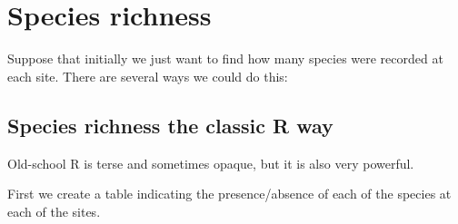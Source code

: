 \documentclass[
  letterpaper,
  DIV=11,
  numbers=noendperiod]{scrreprt}
\newenvironment{Shaded}{\begin{snugshade}}{\end{snugshade}}
\newcommand{\CommentTok}[1]{\textcolor[rgb]{0.37,0.37,0.37}{#1}}
\newcommand{\FunctionTok}[1]{\textcolor[rgb]{0.28,0.35,0.67}{#1}}
\newcommand{\NormalTok}[1]{\textcolor[rgb]{0.00,0.23,0.31}{#1}}
\newcommand{\OtherTok}[1]{\textcolor[rgb]{0.00,0.23,0.31}{#1}}
\newcommand{\SpecialCharTok}[1]{\textcolor[rgb]{0.37,0.37,0.37}{#1}}
\begin{document}
\section{Species richness}\label{species-richness}

Suppose that initially we just want to find how many species were
recorded at each site. There are several ways we could do this:

\subsection{Species richness the classic R
way}\label{species-richness-the-classic-r-way}

Old-school R is terse and sometimes opaque, but it is also very
powerful.

First we create a table indicating the presence/absence of each of the
species at each of the sites.

\begin{Shaded}
\end{Shaded}
\end{document}
